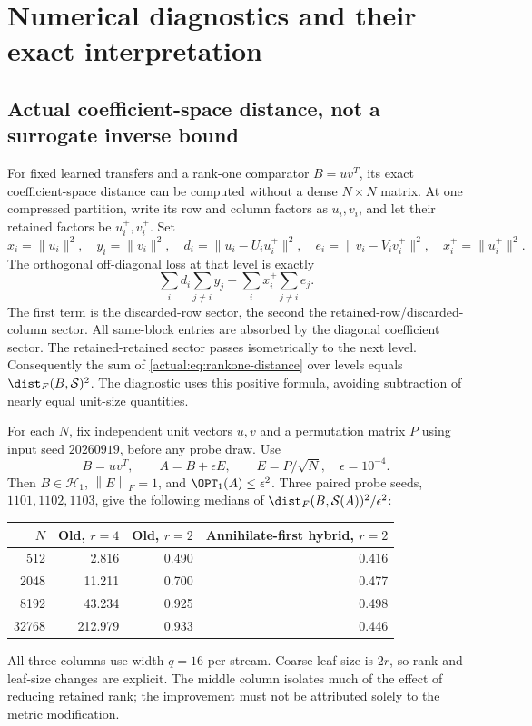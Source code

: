 \documentclass[11pt,oneside,openany,a4paper]{book}
\numberwithin{equation}{chapter}
\theoremstyle{definition}
\theoremstyle{remark}
\newcommand{\F}[1]{\left\lVert#1\right\rVert_F}
\newcommand{\HH}{\mathcal H}\newcommand{\SSS}{\mathcal S}
\begin{document}
\section{Numerical diagnostics and their exact interpretation}
\subsection{Actual coefficient-space distance, not a surrogate inverse bound}
For fixed learned transfers and a rank-one comparator $B=uv^T$, its exact coefficient-space distance can be computed without a dense $N\times N$ matrix. At one compressed partition, write its row and column factors as $u_i,v_i$, and let their retained factors be $u_i^+,v_i^+$. Set
\[
 x_i=\|u_i\|^2,\quad y_i=\|v_i\|^2,\quad
 d_i=\|u_i-U_iu_i^+\|^2,\quad e_i=\|v_i-V_iv_i^+\|^2,
 \quad x_i^+=\|u_i^+\|^2.
\]
The orthogonal off-diagonal loss at that level is exactly
\begin{equation}\label{actual:eq:rankone-distance}
 \sum_i d_i\sum_{j\ne i}y_j+
 \sum_i x_i^+\sum_{j\ne i}e_j.
\end{equation}
The first term is the discarded-row sector, the second the retained-row/discarded-column sector. All same-block entries are absorbed by the diagonal coefficient sector. The retained-retained sector passes isometrically to the next level. Consequently the sum of \eqref{actual:eq:rankone-distance} over levels equals $\dist_F(B,\SSS)^2$. The diagnostic uses this positive formula, avoiding subtraction of nearly equal unit-size quantities.

For each $N$, fix independent unit vectors $u,v$ and a permutation matrix $P$ using input seed $20260919$, before any probe draw. Use
\[
 B=uv^T,\qquad A=B+\epsilon E,\qquad
 E=P/\sqrt N,\quad\epsilon=10^{-4}.
\]
Then $B\in\HH_1$, $\F E=1$, and $\OPT_1(A)\le\epsilon^2$. Three paired probe seeds, $1101,1102,1103$, give the following medians of
$\dist_F(B,\SSS(A))^2/\epsilon^2$:
\begin{center}
\begin{tabular}{rrrr}
\toprule
$N$ & Old, $r=4$ & Old, $r=2$ & Annihilate-first hybrid, $r=2$\\
\midrule
512   & 2.816   & 0.490 & 0.416\\
2048  & 11.211  & 0.700 & 0.477\\
8192  & 43.234  & 0.925 & 0.498\\
32768 & 212.979 & 0.933 & 0.446\\
\bottomrule
\end{tabular}
\end{center}
All three columns use width $q=16$ per stream. Coarse leaf size is $2r$, so rank and leaf-size changes are explicit. The middle column isolates much of the effect of reducing retained rank; the improvement must not be attributed solely to the metric modification.
\end{document}
